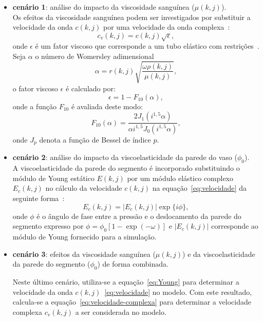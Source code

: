 \documentclass[a4paper,12pt]{monografia}
\theoremstyle{plain}
\theoremstyle{definition}
\theoremstyle{remark}
\begin{document}
\begin{itemize}
	\item \textbf{cenário 1}: análise do impacto da viscosidade sanguínea ($\mu(k,j)$).\\
	Os efeitos da viscosidade sanguínea podem ser investigados por substituir a velocidade
	da onda $c(k,j)$ por uma velocidade da onda complexa~\cite{Duan1992}:
	\begin{equation} 
		c_v(k,j) = c(k,j) \sqrt{\epsilon},\label{eq:velocidade-complexa}
	\end{equation}
	onde $\epsilon$ é um fator viscoso que corresponde a um tubo elástico com restrições~\cite{Duan1992}. Seja $\alpha$ o
	número de Womersley adimensional
	\begin{equation}
		\alpha = r(k,j) \sqrt{\frac{\omega \rho(k,j)}{\mu(k,j)}},
	\end{equation}
	o fator viscoso $\epsilon$ é calculado por:
	\begin{equation}
		\epsilon = 1 - F_{10} (\alpha),
	\end{equation}
	onde a função $F_{10}$ é avaliada deste modo:
	\begin{equation}
		F_{10} (\alpha) = \frac{2 J_1(i^{1,5} \alpha)}{\alpha i^{1,5}J_0(i^{1,5} \alpha)},
	\end{equation}
	onde $J_p$ denota a função de Bessel de índice $p$.
	
	\item \textbf{cenário 2}: análise do impacto da viscoelasticidade da parede do vaso ($\phi_0$).\\
	A viscoelasticidade da parede do segmento é incorporado substituindo o módulo de Young
	estático $E(k,j)$ por um módulo elástico complexo $E_c(k,j)$ no cálculo da velocidade $c(k,j)$ na equação~\eqref{eq:velocidade}
	da seguinte forma~\cite{Duan}:
	\begin{equation}
		E_c(k,j) = |E_c(k,j)| \exp\{i\phi\},\label{eq:Young}
	\end{equation}
	onde $\phi$ é o ângulo de fase entre a pressão e o deslocamento da parede do segmento \cite{Taylor3} expresso por $\phi = \phi_0 [1-\exp(-\omega)]$ e $|E_c (k,j)|$ corresponde ao módulo de Young fornecido para a simulação.
	
	\item \textbf{cenário 3}: efeitos da viscosidade sanguínea ($\mu(k,j)$) e da viscoelasticidade da parede do segmento ($\phi_0$) de forma combinada.
	
	Neste último cenário, utiliza-se a equação~\eqref{eq:Young} para determinar a velocidade da onda $c(k,j)$~\eqref{eq:velocidade} no modelo. Com este resultado, calcula-se  a equação~\eqref{eq:velocidade-complexa} para determinar a velocidade complexa $c_v(k,j)$ a ser considerada no modelo.
\end{itemize}
\end{document}
